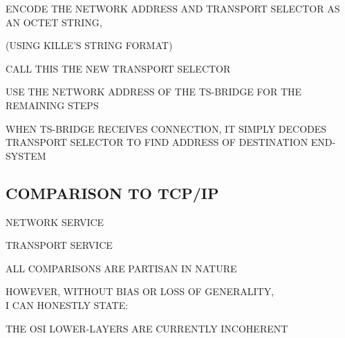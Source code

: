 \begin{bwslide}

\begin{nrtc}
\item	ENCODE THE NETWORK ADDRESS AND TRANSPORT SELECTOR AS AN OCTET STRING,
    \begin{nrtc}
    \item	(USING KILLE'S STRING FORMAT)
    \end{nrtc}
	CALL THIS THE NEW TRANSPORT SELECTOR

\item	USE THE NETWORK ADDRESS OF THE TS-BRIDGE FOR THE REMAINING STEPS

\item	WHEN TS-BRIDGE RECEIVES CONNECTION,
	IT SIMPLY DECODES TRANSPORT SELECTOR TO FIND ADDRESS OF
	DESTINATION END-SYSTEM
\end{nrtc}
\end{bwslide}




\begin{bwslide}
\part	{COMPARISON TO TCP/IP}\bf

\begin{nrtc}
\item	NETWORK SERVICE

\item	TRANSPORT SERVICE
\end{nrtc}
\end{bwslide}


\begin{bwslide}

\begin{nrtc}
\item	ALL COMPARISONS ARE PARTISAN IN NATURE

\item	HOWEVER, WITHOUT BIAS OR LOSS OF GENERALITY,\\ I CAN HONESTLY STATE:
    \begin{nrtc}
    \item	THE OSI LOWER-LAYERS ARE CURRENTLY INCOHERENT
    \end{nrtc}
\end{nrtc}
\end{bwslide}


